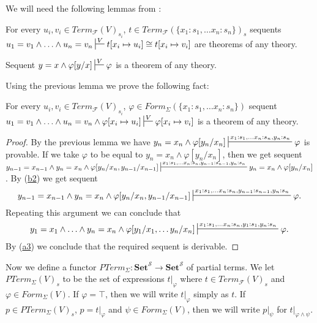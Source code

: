 \documentclass[reqno]{amsart}
\newcommand{\axref}[1]{(\hyperref[ax:#1]{#1})}
\theoremstyle{definition}
\theoremstyle{remark}
\newcommand{\cat}[1]{\mathbf{#1}}
\newcommand{\Set}{\cat{Set}}
\numberwithin{figure}{section}
\begin{document}
We will need the following lemmas from \cite{PHL}:
\begin{lem}[cong-a]
For every $u_i,v_i \in Term_\mathcal{F}(V)_{s_i}$, $t \in Term_\mathcal{F}(\{ x_1 : s_1, \ldots x_n : s_n\})_s$
sequents $u_1 = v_1 \land \ldots \land u_n = v_n \sststile{}{V} t[x_i \mapsto u_i] \cong t[x_i \mapsto v_i]$ are theorems of any theory.
\end{lem}

\begin{lem}
Sequent $y = x \land \varphi[y/x] \sststile{}{V} \varphi$ is a theorem of any theory.
\end{lem}

Using the previous lemma we prove the following fact:

\begin{lem}[cong-b]
For every $u_i,v_i \in Term_\mathcal{F}(V)_{s_i}$, $\varphi \in Form_\Sigma(\{ x_1 : s_1, \ldots x_n : s_n\})$
sequent $u_1 = v_1 \land \ldots \land u_n = v_n \land \varphi[x_i \mapsto u_i] \sststile{}{V} \varphi[x_i \mapsto v_i]$ is a theorem of any theory.
\end{lem}
\begin{proof}
By the previous lemma we have $y_n = x_n \land \varphi[y_n/x_n] \sststile{}{x_1 : s_1, \ldots x_n : s_n, y_n : s_n} \varphi$ is provable.
If we take $\varphi$ to be equal to $y_n = x_n \land \varphi[y_n/x_n]$, then we get sequent
$y_{n-1} = x_{n-1} \land y_n = x_n \land \varphi[y_n/x_n,y_{n-1}/x_{n-1}] \sststile{}{x_1 : s_1, \ldots x_n : s_n, y_{n-1} : s_{n-1}, y_n : s_n} y_n = x_n \land \varphi[y_n/x_n]$.
By \axref{b2} we get sequent
\[ y_{n-1} = x_{n-1} \land y_n = x_n \land \varphi[y_n/x_n,y_{n-1}/x_{n-1}] \sststile{}{x_1 : s_1, \ldots x_n : s_n, y_{n-1} : s_{n-1}, y_n : s_n} \varphi. \]
Repeating this argument we can conclude that
\[ y_1 = x_1 \land \ldots \land y_n = x_n \land \varphi[y_1/x_1, \ldots y_n/x_n] \sststile{}{x_1 : s_1, \ldots x_n : s_n, y_1 : s_1, y_n : s_n} \varphi. \]
By \axref{a3} we conclude that the required sequent is derivable.
\end{proof}

Now we define a functor $PTerm_\Sigma : \Set^\mathcal{S} \to \Set^\mathcal{S}$ of partial terms.
We let $PTerm_\Sigma(V)_s$ to be the set of expressions $t|_\varphi$ where $t \in Term_\mathcal{F}(V)_s$ and $\varphi \in Form_\Sigma(V)$.
If $\varphi = \top$, then we will write $t|_\varphi$ simply as $t$.
If $p \in PTerm_\Sigma(V)_s$, $p = t|_\varphi$ and $\psi \in Form_\Sigma(V)$, then we will write $p|_\psi$ for $t|_{\varphi \land \psi}$.
\end{document}
